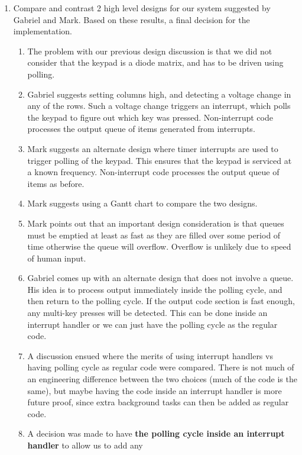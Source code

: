 \documentclass[11pt,a4paper]{scrartcl}
\begin{document}
\begin{enumerate}

\item Compare and contrast 2 high level designs for our system suggested by Gabriel and Mark.
Based on these results, a final decision for the implementation.

\begin{enumerate}
    \item The problem with our previous design discussion is that we did not consider that the keypad is a diode matrix,
        and has to be driven using polling.
    \item Gabriel suggests setting columns high, and detecting a voltage change in any of the rows. Such a voltage change
        triggers an interrupt, which polls the keypad to figure out which key was pressed.
        Non-interrupt code processes the output queue of items generated from interrupts.
    \item Mark suggests an alternate design where timer interrupts are used to trigger polling of the keypad.
        This ensures that the keypad is serviced at a known frequency.
        Non-interrupt code processes the output queue of items as before.
    \item Mark suggests using a Gantt chart to compare the two designs.
    \item Mark points out that an important design consideration is that queues must be emptied at least as fast as they are
        filled over some period of time otherwise the queue will overflow. Overflow is unlikely due to speed of human input.
    \item Gabriel comes up with an alternate design that does not involve a queue.
        His idea is to process output immediately inside the polling cycle, and
        then return to the polling cycle. If the output code section is fast enough, 
        any multi-key presses will be detected. This can be done inside an interrupt handler or we can just have the
        polling cycle as the regular code.
    \item A discussion ensued where the merits of using interrupt handlers vs having polling cycle as regular code were
        compared. There is not much of an engineering difference between the two choices (much of the code is the same),
        but maybe having the code inside an interrupt handler is more future proof, since extra background tasks can then
        be added as regular code.
    \item A decision was made to have \textbf{the polling cycle inside an interrupt handler} to allow us to add any 

\end{enumerate}
\end{enumerate}
\end{document}
